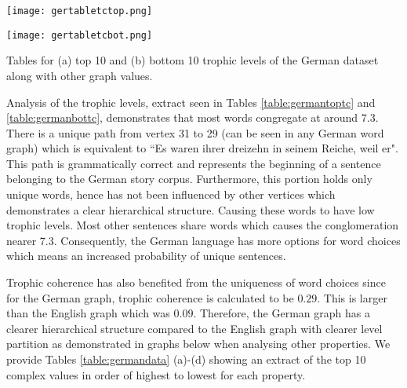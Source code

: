 \begin{table}[!htb]
\centering
\begin{subtable}{.45\textwidth}
	\centering
	\texttt{[image: gertabletctop.png]}
	\caption{}
	\label{table:germantoptc}
\end{subtable}
\hfill
\begin{subtable}{.45\textwidth}
	\centering
	\texttt{[image: gertabletcbot.png]}
	\caption{}
	\label{table:germanbottc}
\end{subtable}
\caption{Tables for (a) top 10 and (b) bottom 10 trophic levels of the German dataset along with other graph values.}
\end{table}

Analysis of the trophic levels, extract seen in Tables \ref{table:germantoptc} and \ref{table:germanbottc}, demonstrates that most words congregate at around $7.3$. There is a unique path from vertex 31 to 29 (can be seen in any German word graph) which is equivalent to ``Es waren ihrer dreizehn in seinem Reiche, weil er". This path is grammatically correct and represents the beginning of a sentence belonging to the German story corpus. Furthermore, this portion holds only unique words, hence has not been influenced by other vertices which demonstrates a clear hierarchical structure. Causing these words to have low trophic levels. Most other sentences share words which causes the conglomeration nearer $7.3$. Consequently, the German language has more options for word choices which means an increased probability of unique sentences.

Trophic coherence has also benefited from the uniqueness of word choices since for the German graph, trophic coherence is calculated to be $0.29$. This is larger than the English graph which was $0.09$. Therefore, the German graph has a clearer hierarchical structure compared to the English graph with clearer level partition as demonstrated in graphs below when analysing other properties. We provide Tables \ref{table:germandata} (a)-(d) showing an extract of the top 10 complex values in order of highest to lowest for each property.

